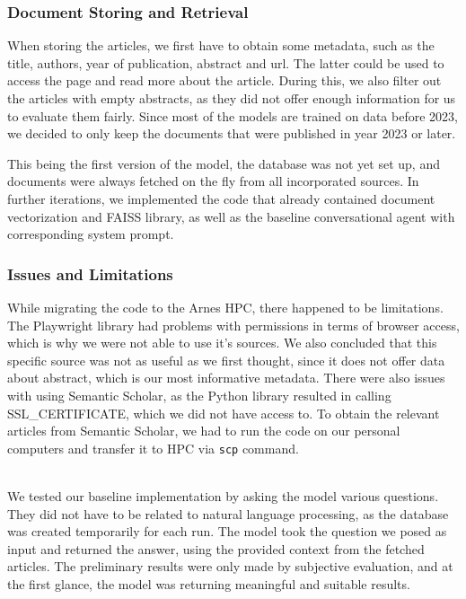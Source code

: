 \documentclass[fleqn,moreauthors,10pt]{ds_report}
\begin{document}
\subsubsection*{Document Storing and Retrieval}

When storing the articles, we first have to obtain some metadata, such as the title, authors, year of publication, abstract and url. The latter could be used to access the page and read more about the article. During this, we also filter out the articles with empty abstracts, as they did not offer enough information for us to evaluate them fairly. Since most of the models are trained on data before 2023, we decided to only keep the documents that were published in year 2023 or later.

This being the first version of the model, the database was not yet set up, and documents were always fetched on the fly from all incorporated sources. In further iterations, we implemented the code that already contained document vectorization and FAISS library, as well as the baseline conversational agent with corresponding system prompt. 

\subsubsection*{Issues and Limitations}

While migrating the code to the Arnes HPC, there happened to be limitations. The Playwright library had problems with permissions in terms of browser access, which is why we were not able to use it's sources. We also concluded that this specific source was not as useful as we first thought, since it does not offer data about abstract, which is our most informative metadata. There were also issues with using Semantic Scholar, as the Python library resulted in calling SSL\_CERTIFICATE, which we did not have access to. To obtain the relevant articles from Semantic Scholar, we had to run the code on our personal computers and transfer it to HPC via \texttt{scp} command.

\\

We tested our baseline implementation by asking the model various questions. They did not have to be related to natural language processing, as the database was created temporarily for each run. The model took the question we posed as input and returned the answer, using the provided context from the fetched articles. The preliminary results were only made by subjective evaluation, and at the first glance, the model was returning meaningful and suitable results.
\end{document}
